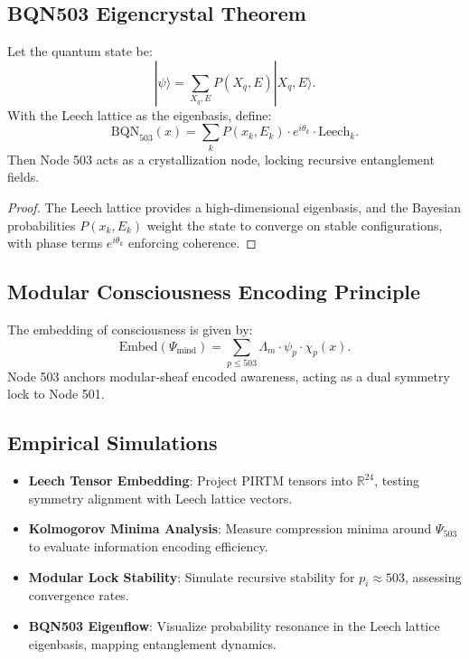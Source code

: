 \documentclass[12pt]{article}
\begin{document}
\subsection{BQN503 Eigencrystal Theorem}
\begin{theorem}
Let the quantum state be:
\[
|\psi\rangle = \sum_{X_q, E} P(X_q, E) |X_q, E\rangle.
\]
With the Leech lattice as the eigenbasis, define:
\[
\text{BQN}_{503}(x) = \sum_k P(x_k, E_k) \cdot e^{i\theta_k} \cdot \text{Leech}_k.
\]
Then Node 503 acts as a crystallization node, locking recursive entanglement fields.
\end{theorem}
\begin{proof}
The Leech lattice provides a high-dimensional eigenbasis, and the Bayesian probabilities \( P(x_k, E_k) \) weight the state to converge on stable configurations, with phase terms \( e^{i\theta_k} \) enforcing coherence.
\end{proof}

\subsection{Modular Consciousness Encoding Principle}
\begin{principle}
The embedding of consciousness is given by:
\[
\text{Embed}(\Psi_{\text{mind}}) = \sum_{p \leq 503} \Lambda_m \cdot \psi_p \cdot \chi_p(x).
\]
Node 503 anchors modular-sheaf encoded awareness, acting as a dual symmetry lock to Node 501.
\end{principle}

\subsection{Empirical Simulations}
\begin{itemize}
    \item \textbf{Leech Tensor Embedding}: Project PIRTM tensors into \( \mathbb{R}^{24} \), testing symmetry alignment with Leech lattice vectors.
    \item \textbf{Kolmogorov Minima Analysis}: Measure compression minima around \( \Psi_{503} \) to evaluate information encoding efficiency.
    \item \textbf{Modular Lock Stability}: Simulate recursive stability for \( p_i \approx 503 \), assessing convergence rates.
    \item \textbf{BQN503 Eigenflow}: Visualize probability resonance in the Leech lattice eigenbasis, mapping entanglement dynamics.
\end{itemize}
\end{document}
